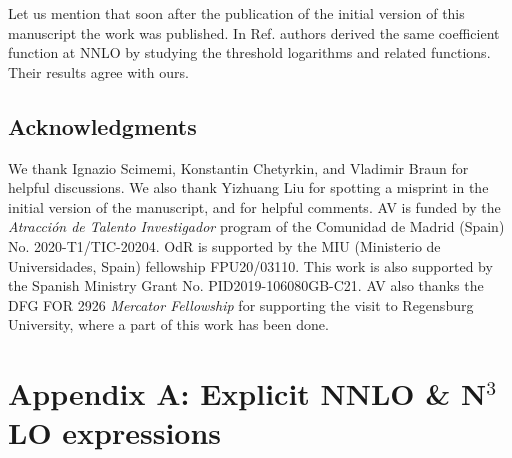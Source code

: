 \documentclass[aps,prl,twocolumn,secnumarabic,notitlepage,superscriptaddress,nofootinbib,tightenlines,floatfix,preprintnumbers]{revtex4-1}
\renewcommand{\(}{\left(}
\renewcommand{\)}{\right)}
\renewcommand{\[}{\left[}
\renewcommand{\]}{\right]}
\begin{document}
Let us mention that soon after the publication of the initial version of this manuscript the work \cite{Ji:2023pba} was published. In Ref.\cite{Ji:2023pba} authors derived the same coefficient function at NNLO by studying the threshold logarithms and related functions. Their results agree with ours.



\begin{acknowledgments}
\section*{Acknowledgments}
We thank Ignazio Scimemi, Konstantin Chetyrkin, and Vladimir Braun for helpful discussions. We also thank Yizhuang Liu for spotting a misprint in the initial version of the manuscript, and for helpful comments. AV is funded by the \textit{Atracci\'on de Talento Investigador} program of the Comunidad de Madrid (Spain) No. 2020-T1/TIC-20204. OdR is supported by the MIU (Ministerio de Universidades, Spain) fellowship FPU20/03110. This work is also supported by the Spanish Ministry Grant No. PID2019-106080GB-C21. AV also thanks the DFG FOR 2926 \textit{Mercator Fellowship} for supporting the visit to Regensburg University, where a part of this work has been done.
\end{acknowledgments}

\appendix

\section{Appendix A: Explicit NNLO \& N$^3$LO expressions}
\end{document}
